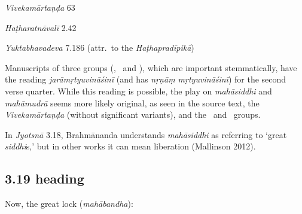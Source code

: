 \begin{ekdosis}
\begin{sources}[hp03_018]
\emph{Vivekamārtaṇḍa} 63
\begin{versinnote}
\end{versinnote}
\end{sources}

\begin{testimonia}[hp03_018]
\emph{Haṭharatnāvalī} 2.42
\begin{versinnote}
\end{versinnote}

\emph{Yuktabhavadeva} 7.186 (attr.~to the \emph{Haṭhapradīpikā})
\begin{versinnote}
\end{versinnote}
\end{testimonia}

\begin{philcomm}[hp03_018]
Manuscripts of three groups (\textalpha, \textbeta\ and \textgamma), which are important stemmatically, have the reading \emph{jarāmṛtyuvināśinī} (and  has \emph{nṛṇāṃ mṛtyuvināśinī}) for the second verse quarter. While this reading is possible, the play on \emph{mahāsiddhi} and \emph{mahāmudrā} seems more likely original, as seen in the source text, the \emph{Vivekamārtaṇḍa} (without significant variants), and the \texteta\ and \textepsilon\ groups. 

In \emph{Jyotsnā} 3.18, Brahmānanda understands \emph{mahāsiddhi} as referring to `great \emph{siddhi}s,' but in other works it can mean liberation (Mallinson 2012).
\end{philcomm}

\subsection*{3.19 heading}
\begin{translation}[hp03_019a]
Now, the great lock (\emph{mahābandha}):
\end{translation}


\end{ekdosis}
